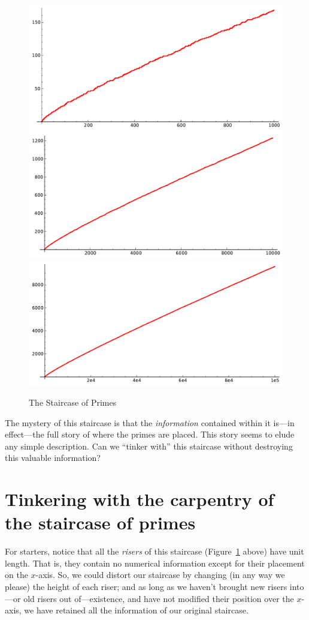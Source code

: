 \documentclass[openany]{book}
\theoremstyle{plain}
\theoremstyle{definition}
\begin{document}
{{\begin{figure}[H]
\includegraphics[width=.4\textwidth]{illustrations/PN_1000}
\includegraphics[width=.4\textwidth]{illustrations/PN_10000}\\

\includegraphics[width=.6\textwidth]{illustrations/PN_100000}


\caption{The Staircase of Primes\label{fig:staircases}}
\end{figure}

The mystery of this staircase is that the {\em information} contained
within it is---in effect---the full story of where the primes are
placed. This story seems to elude any simple description.  Can we
``tinker with'' this staircase without destroying this valuable
information?




\chapter[Tinkering with the staircase of primes]{Tinkering with the carpentry of the staircase of primes\label{sec:tinkering}}


For starters, notice that all the {\em risers} of this staircase (Figure~\ref{fig:staircases} above) have
unit length. That is, they contain no numerical information except for
their placement on the $x$-axis. So, we could distort our staircase by
changing (in any way we please) the height of each riser; and as long
as we haven't brought new risers into---or old risers out
of---existence, and have not modified their position over the
$x$-axis, we have retained all the information of our original
staircase.


}}
\end{document}
